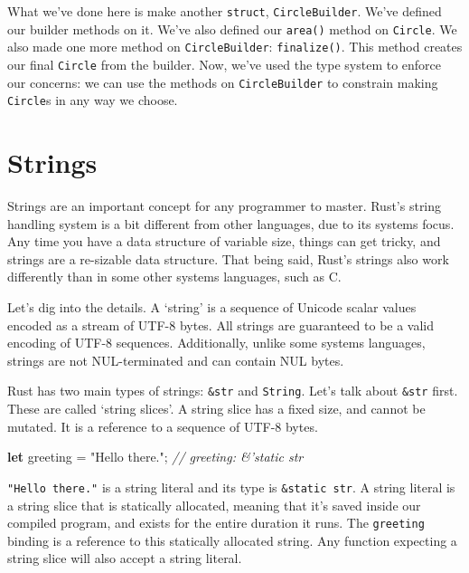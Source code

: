\documentclass[a4paper,]{book}
\renewcommand*{\hypertarget}[3][\ar]{%
  \def\ar{#2}%
  \label{#1}%
  #3}
\newenvironment{Shaded}{\begin{snugshade}}{\end{snugshade}}
\newcommand{\KeywordTok}[1]{\textcolor[rgb]{0.13,0.29,0.53}{\textbf{{#1}}}}
\newcommand{\StringTok}[1]{\textcolor[rgb]{0.31,0.60,0.02}{{#1}}}
\newcommand{\CommentTok}[1]{\textcolor[rgb]{0.56,0.35,0.01}{\textit{{#1}}}}
\newcommand{\NormalTok}[1]{{#1}}
\begin{document}
What we've done here is make another \texttt{struct},
\texttt{CircleBuilder}. We've defined our builder methods on it. We've
also defined our \texttt{area()} method on \texttt{Circle}. We also made
one more method on \texttt{CircleBuilder}: \texttt{finalize()}. This
method creates our final \texttt{Circle} from the builder. Now, we've
used the type system to enforce our concerns: we can use the methods on
\texttt{CircleBuilder} to constrain making \texttt{Circle}s in any way
we choose.

\hypertarget{sec--strings}{\section{Strings}\label{sec--strings}}

Strings are an important concept for any programmer to master. Rust's
string handling system is a bit different from other languages, due to
its systems focus. Any time you have a data structure of variable size,
things can get tricky, and strings are a re-sizable data structure. That
being said, Rust's strings also work differently than in some other
systems languages, such as C.

Let's dig into the details. A `string' is a sequence of Unicode scalar
values encoded as a stream of UTF-8 bytes. All strings are guaranteed to
be a valid encoding of UTF-8 sequences. Additionally, unlike some
systems languages, strings are not NUL-terminated and can contain NUL
bytes.

Rust has two main types of strings: \texttt{\&str} and \texttt{String}.
Let's talk about \texttt{\&str} first. These are called `string slices'.
A string slice has a fixed size, and cannot be mutated. It is a
reference to a sequence of UTF-8 bytes.

\begin{Shaded}
\begin{Highlighting}[]
\KeywordTok{let} \NormalTok{greeting = }\StringTok{"Hello there."}\NormalTok{; }\CommentTok{// greeting: &'static str}
\end{Highlighting}
\end{Shaded}

\texttt{"Hello\ there."} is a string literal and its type is
\texttt{\&\textquotesingle{}static\ str}. A string literal is a string
slice that is statically allocated, meaning that it's saved inside our
compiled program, and exists for the entire duration it runs. The
\texttt{greeting} binding is a reference to this statically allocated
string. Any function expecting a string slice will also accept a string
literal.
\end{document}
